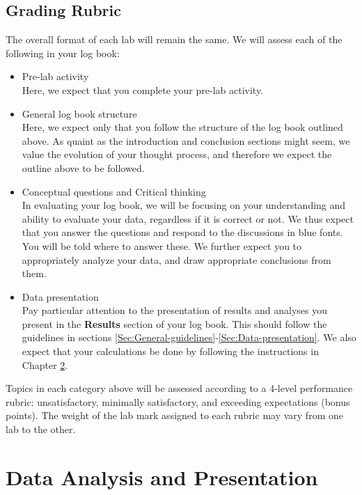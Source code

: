 \documentclass[12pt]{report}
\begin{document}
\section{Grading Rubric}
The overall format of each lab will remain the same.  We will assess each of the following in your log book:

\begin{itemize}
\item Pre-lab activity \\
Here, we expect that you complete your pre-lab activity.

\item General log book structure \\
Here, we expect only that you follow the structure of the log book outlined above. As quaint as the introduction and conclusion sections might seem, we value the evolution of your thought process, and therefore we expect the outline above to be followed.

\item Conceptual questions and Critical thinking \\
In evaluating your log book, we will be focusing on your understanding and ability to evaluate your data, regardless if it is correct or not. {\color{blue} We thus expect that you answer the questions and respond to the discussions in blue fonts. You will be told where to answer these.}
We further expect you to appropriately analyze your data, and  draw appropriate conclusions from them.

\item Data presentation \\
Pay particular attention to the presentation of results and analyses you present in the \textbf{Results} section of your log book. This should follow the guidelines in sections \ref{Sec:General-guidelines}-\ref{Sec:Data-presentation}. We also expect that your calculations be done  by following the instructions in Chapter \ref{Ch:Data-analysis}.
\end{itemize}

Topics in each category above will be assessed according to a 4-level performance rubric: unsatisfactory, minimally satisfactory, and exceeding expectations (bonus points). The weight of the lab mark assigned to each rubric may vary from one lab to the other.


\chapter{Data Analysis and Presentation}
\label{Ch:Data-analysis}
\end{document}
